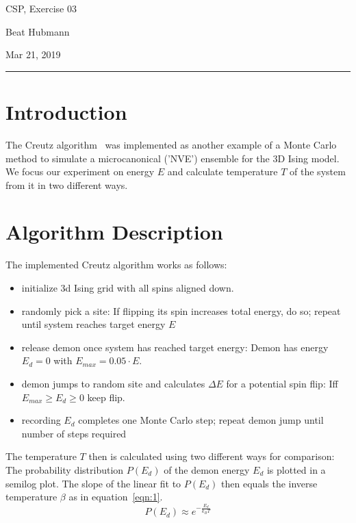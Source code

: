 \documentclass[11pt,a4paper]{article}
\begin{document}
\noindent\parbox{\linewidth}{
 \parbox{.25\linewidth}{ \large CSP, Exercise 03 }\hfill
 \parbox{.5\linewidth}{\begin{center} \large Beat Hubmann \end{center}}\hfill
 \parbox{.2\linewidth}{\begin{flushright} \large Mar 21, 2019 \end{flushright}}
}
\noindent\rule{\linewidth}{2pt}


\section{Introduction}

The Creutz algorithm~\cite{creutz} was implemented as another example of a Monte Carlo method to simulate
a microcanonical ('NVE') ensemble for the 3D Ising model. We focus our experiment on energy $E$ and calculate
temperature $T$ of the system from it in two different ways.

\section{Algorithm Description}
The implemented Creutz algorithm works as follows:
\begin{itemize}
	\item initialize 3d Ising grid with all spins aligned down.
	\item randomly pick a site: If flipping its spin increases total energy, do so;
	 repeat until system reaches target energy $E$
	\item release demon once system has reached target energy: Demon has energy $E_d=0$ with $E_{max}= 0.05\cdot E$. 
	\item demon jumps to random site and calculates $\Delta E$ for a potential spin flip: Iff $E_{max} \geq E_d \geq 0$ keep flip.
	\item recording $E_d$ completes one Monte Carlo step; repeat demon jump until number of steps required
\end{itemize}
The temperature $T$ then is calculated using two different ways for comparison:\\
The probability distribution $P(E_d)$ of the demon energy $E_d$ is plotted in a semilog plot.
The slope of the linear fit to $P(E_d)$ then equals the inverse temperature $\beta$ as in equation~\ref{eqn:1}.\\


\begin{equation}
	P(E_d) \approx e^{-\frac{E_d}{k_BT}}
\label{eqn:1}
\end{equation}
\end{document}
